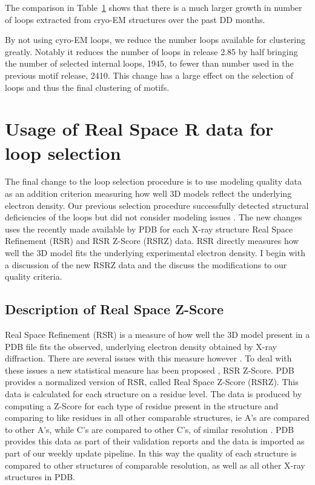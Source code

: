 \begin{table}
  \begin{tabular}{lr}
    \toprule
    \midrule
    \bottomrule
  \end{tabular}
  \caption{}
  \label{tab:source-counts}
\end{table}

The comparison in Table~\ref{tab:source-counts} shows that there is a much
larger growth in number of loops extracted from cryo-EM structures over the past
DD months. 

By not using cyro-EM loops, we reduce the number loops available for clustering
greatly. Notably it reduces the number of loops in release 2.85 by half bringing
the number of selected internal loops, 1945, to fewer than number used in the
previous motif release, 2410. This change has a large effect on the selection of
loops and thus the final clustering of motifs. 

\section{Usage of Real Space R data for loop selection}

The final change to the loop selection procedure is to use modeling quality data
as an addition criterion measuring how well 3D models reflect the underlying
electron density. Our previous selection procedure successfully detected
structural deficiencies of the loops but did not consider modeling issues
\cite{Petrov2012}. The new changes uses the recently made available by PDB for
each X-ray structure Real Space Refinement (RSR) and RSR Z-Score (RSRZ) data.
RSR directly measures how well the 3D model fits the underlying experimental
electron density. I begin with a discussion of the new RSRZ data and the discuss
the modifications to our quality criteria.

\subsection{Description of Real Space Z-Score}

Real Space Refinement (RSR) is a measure of how well the 3D model present in a
PDB file fits the observed, underlying electron density obtained by X-ray
diffraction. There are several issues with this measure however
\cite{Tickle2012}. To deal with these issues a new statistical measure has been
proposed \cite{Gore2012}, RSR Z-Score. PDB provides a normalized version of RSR,
called Real Space Z-Score (RSRZ). This data is calculated for each structure on
a residue level. The data is produced by computing a Z-Score for each type of
residue present in the structure and comparing to like residues in all other
comparable structures, ie A’s are compared to other A’s, while C’s are compared
to other C’s, of similar resolution \cite{Gore2012, Kleywegt2004a}. PDB provides
this data as part of their validation reports and the data is imported as part
of our weekly update pipeline. In this way the quality of each structure is
compared to other structures of comparable resolution, as well as all other
X-ray structures in PDB.

